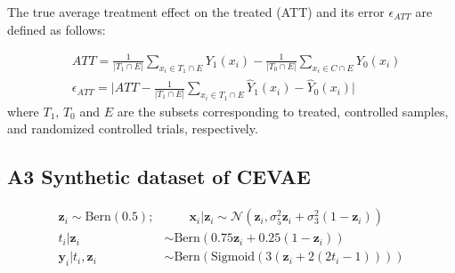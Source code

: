 \documentclass{amia}
\begin{document}
The true average treatment effect on the treated (ATT) and its error $\epsilon_{ATT}$ are defined as follows:

\begin{align} 
\label{ATT}
    &ATT = \frac{1}{|T_1 \cap E|} \sum_{x_i \in T_1 \cap E} Y_1(x_i) - 
    \frac{1}{|T_0 \cap E|} \sum_{x_i \in C \cap E} Y_0(x_i) \\
    &\epsilon_{ATT} =\big|ATT - \frac{1}{|T_1 \cap E|}\sum_{x_i \in T_1 \cap E} 
    \hat{Y}_1(x_i) - \hat{Y}_0(x_i)\big|
\end{align}
\label{equ: ATT}
where $T_1$, $T_0$ and $E$ are the subsets corresponding to treated, controlled samples, and randomized controlled trials, respectively. 

\subsection*{A3 Synthetic dataset of CEVAE} 
\label{CEVAE_dataset}
\begin{align}
\textbf{z}_i \sim \text{Bern}(0.5); & \qquad
\textbf{x}_i|\textbf{z}_i \sim \mathcal{N}(\textbf{z}_i, \sigma^2_{5}\textbf{z}_i + \sigma^2_{3}(1 - \textbf{z}_i)) \nonumber\\
t_i|\textbf{z}_i &\sim \text{Bern}(0.75\textbf{z}_i + 0.25(1 - \textbf{z}_i)) \nonumber\\
\textbf{y}_i|t_i, \textbf{z}_i &\sim \text{Bern}(\text{Sigmoid}(3(\textbf{z}_i + 2(2t_i - 1))))
\label{equ: CEVAE_data}
\end{align}
\end{document}
